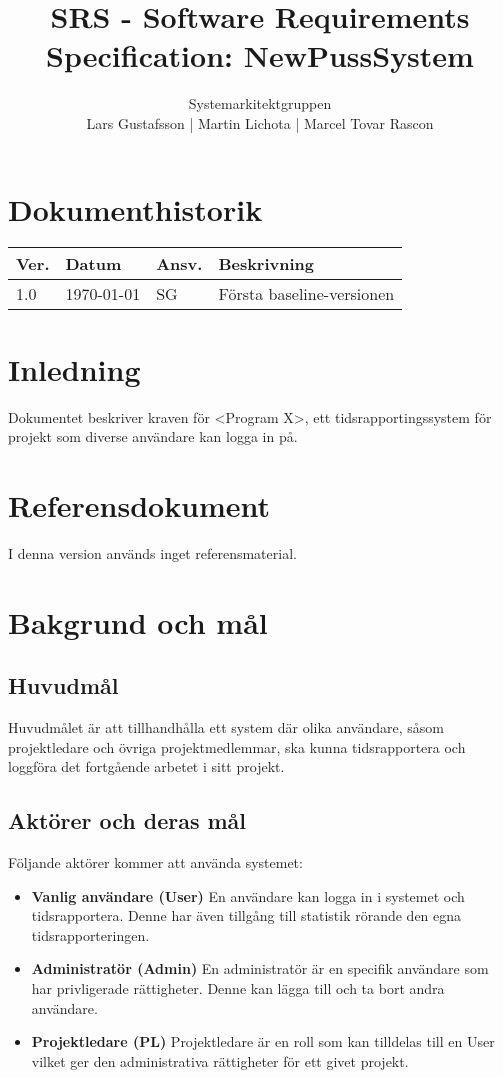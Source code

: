 \documentclass[a4paper]{article}
\title{SRS - Software Requirements Specification: NewPussSystem}
\author{Systemarkitektgruppen \\ Lars Gustafsson | Martin Lichota | Marcel Tovar Rascon}
\date{}
\begin{document}
\maketitle
\thispagestyle{fancy}
\tableofcontents
\newpage

\section*{Dokumenthistorik}

\begin{tabular}{ l l l l }
Ver. & Datum & Ansv. & Beskrivning \\\hline
1.0 & \today & SG & Första baseline-versionen

\end{tabular}
\section{Inledning}       


Dokumentet beskriver kraven för <Program X>, ett tidsrapportingssystem för projekt som diverse användare kan logga in på.

\section{Referensdokument}
I denna version används inget referensmaterial.
\section{Bakgrund och mål}   
\subsection{Huvudmål}
Huvudmålet är att tillhandhålla ett system där olika användare, såsom projektledare och övriga projektmedlemmar, ska kunna tidsrapportera och loggföra det fortgående arbetet i sitt projekt. 

\subsection{Aktörer och deras mål}
Följande aktörer kommer att använda systemet:
\begin{itemize}
\item [] \textbf{Vanlig användare (User)} En användare kan logga in i systemet och tidsrapportera. Denne har även tillgång till statistik rörande den egna tidsrapporteringen.
\item [] \textbf{Administratör (Admin)} En administratör är en specifik användare som har privligerade rättigheter. Denne kan lägga till och ta bort andra användare.
\item [] \textbf{Projektledare (PL)} Projektledare är en roll som kan tilldelas till en User vilket ger den administrativa rättigheter för ett givet projekt.
\end{itemize}
\end{document}
